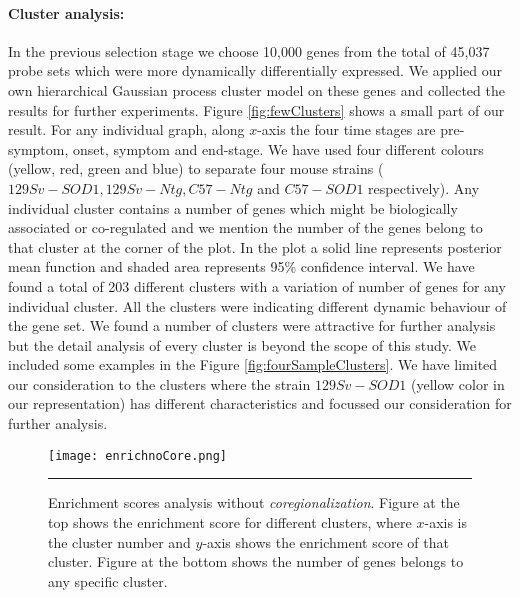 \paragraph{Cluster analysis:} 
In the previous selection stage we choose 10,000 genes from the total of 45,037 probe sets which were more dynamically differentially expressed. We applied our own hierarchical Gaussian process cluster model on these genes and collected the results for further experiments. Figure \ref{fig:fewClusters} shows a small part of our result. For any individual graph, along $x$-axis the four time stages are pre-symptom, onset, symptom and end-stage. We have used four different colours (yellow, red, green and blue) to separate four mouse strains ($129Sv-SOD1, 129Sv-Ntg, C57-Ntg$ and $C57-SOD1$ respectively). Any individual cluster contains a number of genes which might be biologically associated or co-regulated and we mention the number of the genes belong to that cluster at the corner of the plot. In the plot a solid line represents posterior mean function and shaded area represents 95\% confidence interval. We have found a total of 203 different clusters with a variation of number of genes for any individual cluster. All the clusters were indicating different dynamic behaviour of the gene set. We found a number of clusters were attractive for further analysis but the detail analysis of every cluster is beyond the scope of this study. We included some examples in the Figure \ref{fig:fourSampleClusters}. We have limited our consideration to the clusters where the strain $129Sv-SOD1$ (yellow color in our representation) has different characteristics and focussed our consideration for further analysis.
\begin{figure}
	\centering
		\texttt{[image: enrichnoCore.png]}
		\rule{35em}{0.5pt}
	\caption[Enrichment scores analysis for different clusters without \emph{coregionalization}]
		{Enrichment scores analysis without \emph{coregionalization}. Figure at the top shows the enrichment score for different clusters, where $x$-axis is the cluster number and $y$-axis shows the  enrichment score of that cluster. Figure at the bottom shows the number of genes belongs to any specific cluster.}
	\label{fig:enrichNoCoregionalization}
\end{figure}

